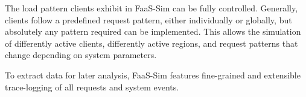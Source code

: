 The load pattern clients exhibit in FaaS-Sim can be fully controlled.
Generally, clients follow a predefined request pattern, either individually or globally, but absolutely any pattern required can be implemented.
This allows the simulation of differently active clients, differently active regions, and request patterns that change depending on system parameters.

To extract data for later analysis, FaaS-Sim features fine-grained and extensible trace-logging of all requests and system events.
